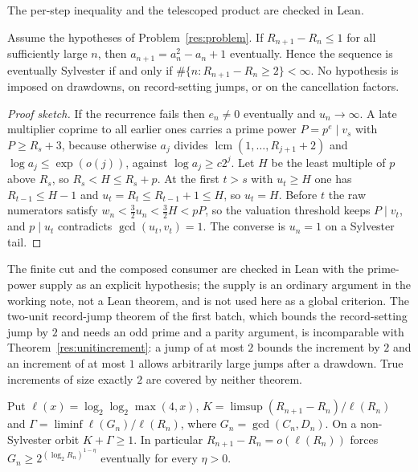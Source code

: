 The per-step inequality and the telescoped product are checked in Lean.

\begin{theorem}\label{res:unitincrement}
Assume the hypotheses of Problem~\ref{res:problem}.  If $R_{n+1}-R_n\le1$ for
all sufficiently large $n$, then $a_{n+1}=a_n^2-a_n+1$ eventually.  Hence the
sequence is eventually Sylvester if and only if
$\#\{n:R_{n+1}-R_n\ge2\}<\infty$.  No hypothesis is imposed on drawdowns, on
record-setting jumps, or on the cancellation factors.
\end{theorem}

\begin{proof}[Proof sketch]
If the recurrence fails then $e_n\neq0$ eventually and $u_n\to\infty$.  A late
multiplier coprime to all earlier ones carries a prime power $P=p^e\mid v_s$
with $P\ge R_s+3$, because otherwise $a_j$ divides $\operatorname{lcm}(1,\ldots,R_{j+1}+2)$
and $\log a_j\le\exp(o(j))$, against $\log a_j\ge c2^j$.  Let $H$ be the least
multiple of $p$ above $R_s$, so $R_s<H\le R_s+p$.  At the first $t>s$ with
$u_t\ge H$ one has $R_{t-1}\le H-1$ and $u_t=R_t\le R_{t-1}+1\le H$, so $u_t=H$.
Before $t$ the raw numerators satisfy $w_n<\tfrac32u_n<\tfrac32H<pP$, so the
valuation threshold keeps $P\mid v_t$, and $p\mid u_t$ contradicts
$\gcd(u_t,v_t)=1$.  The converse is $u_n=1$ on a Sylvester tail.
\end{proof}

The finite cut and the composed consumer are checked in Lean with the
prime-power supply as an explicit hypothesis; the supply is an ordinary
argument in the working note, not a Lean theorem, and is not used here as a
global criterion.  The two-unit record-jump theorem of the first batch, which bounds
the record-setting jump by $2$ and needs an odd prime and a parity argument, is
incomparable with Theorem~\ref{res:unitincrement}: a jump of at most $2$ bounds
the increment by $2$ and an increment of at most $1$ allows arbitrarily large
jumps after a drawdown.  True increments of size exactly $2$ are covered by
neither theorem.

\begin{theorem}\label{res:kgamma}
Put $\ell(x)=\log_2\log_2\max(4,x)$, $K=\limsup(R_{n+1}-R_n)/\ell(R_n)$ and
$\Gamma=\liminf\ell(G_n)/\ell(R_n)$, where $G_n=\gcd(C_n,D_n)$.  On a
non-Sylvester orbit $K+\Gamma\ge1$.  In particular
$R_{n+1}-R_n=o(\ell(R_n))$ forces $G_n\ge2^{(\log_2R_n)^{1-\eta}}$ eventually
for every $\eta>0$.
\end{theorem}

